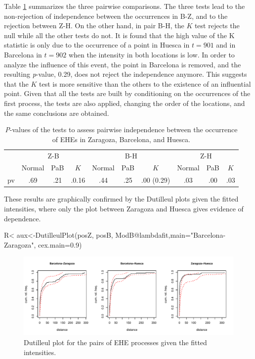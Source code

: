 														
Table \ref{Table8} summarizes  the three pairwise comparisons.   The three tests lead to the non-rejection of  independence between the occurrences in  B-Z, and to the rejection   between Z-H. On the other hand,   in  pair B-H,  the  $K$  test  rejects the null while all the other tests do not. It is found that  the high value of the  K statistic  is only due to the occurrence of a point  in Huesca in  $t=901$ and  in Barcelona in $t=902$ when the intensity in both locations is  low. In order to analyze the influence of this event, the point in Barcelona is removed, and the  resulting \emph{p}-value, 0.29, does not reject the independence anymore.  
This suggests that the $K$  test is more sensitive than the others to the existence of  an influential point.
Given that  all the tests are built by conditioning  on the occurrences of the first process,   the tests are also applied, changing the order of the locations, and  the same conclusions are obtained. 													
														
\begin{table}[t] \footnotesize	
	\begin{tabular}{cccccccccc}
	\toprule
	 &  \multicolumn{3}{c}{Z-B } &   \multicolumn{3}{c}{B-H}  &  \multicolumn{3}{c}{Z-H} \\ 
	 &  Normal &   PaB  &  $K$  &  Normal &   PaB  &  $K$   &  Normal &   PaB  &  $K$ \\  \midrule		
	  pv  &  .69 &   .21  &  .0.16 & .44  & .25   & .00 (0.29)     & .03 &  .00   & .03 \\ \bottomrule
	\end{tabular}
	\caption{\emph{P}-values of the tests to assess pairwise independence between the occurrence of  EHEs in  Zaragoza, Barcelona, and Huesca.} \label{Table8}
\end{table}
														
These results are graphically confirmed  by the Dutilleul plots given the fitted intensities, where  only the plot  between Zaragoza and Huesca gives evidence of dependence.
														
\begin{example}
R< aux<-DutilleulPlot(posZ, posB, ModB@lambdafit,main="Barcelona-Zaragoza",
       cex.main=0.9)
\end{example}

\begin{figure}[h]
		\includegraphics[width=14cm]{figure/Sev12-1} 
		\caption{Dutilleul plot for the pairs of EHE processes  given the fitted intensities. \label{FigDutilleul2}}
\end{figure}
														
